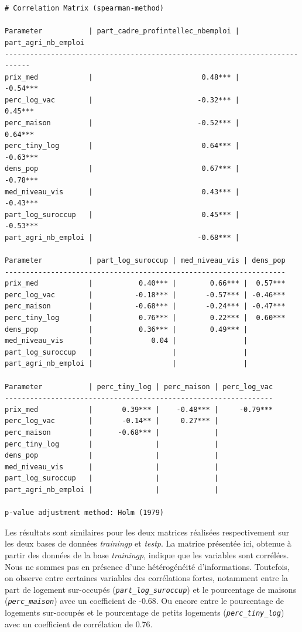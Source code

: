 \documentclass[
  french,
  11pt,
  a4paper,
]{article}
\begin{document}
\begin{verbatim}
# Correlation Matrix (spearman-method)

Parameter           | part_cadre_profintellec_nbemploi | part_agri_nb_emploi
----------------------------------------------------------------------------
prix_med            |                          0.48*** |            -0.54***
perc_log_vac        |                         -0.32*** |             0.45***
perc_maison         |                         -0.52*** |             0.64***
perc_tiny_log       |                          0.64*** |            -0.63***
dens_pop            |                          0.67*** |            -0.78***
med_niveau_vis      |                          0.43*** |            -0.43***
part_log_suroccup   |                          0.45*** |            -0.53***
part_agri_nb_emploi |                         -0.68*** |                    

Parameter           | part_log_suroccup | med_niveau_vis | dens_pop
-------------------------------------------------------------------
prix_med            |           0.40*** |        0.66*** |  0.57***
perc_log_vac        |          -0.18*** |       -0.57*** | -0.46***
perc_maison         |          -0.68*** |       -0.24*** | -0.47***
perc_tiny_log       |           0.76*** |        0.22*** |  0.60***
dens_pop            |           0.36*** |        0.49*** |         
med_niveau_vis      |              0.04 |                |         
part_log_suroccup   |                   |                |         
part_agri_nb_emploi |                   |                |         

Parameter           | perc_tiny_log | perc_maison | perc_log_vac
----------------------------------------------------------------
prix_med            |       0.39*** |    -0.48*** |     -0.79***
perc_log_vac        |       -0.14** |     0.27*** |             
perc_maison         |      -0.68*** |             |             
perc_tiny_log       |               |             |             
dens_pop            |               |             |             
med_niveau_vis      |               |             |             
part_log_suroccup   |               |             |             
part_agri_nb_emploi |               |             |             

p-value adjustment method: Holm (1979)
\end{verbatim}

Les résultats sont similaires pour les deux matrices réalisées
respectivement sur les deux bases de données \emph{trainingp} et
\emph{testp}. La matrice présentée ici, obtenue à partir des données de
la base \emph{trainingp}, indique que les variables sont corrélées. Nous
ne sommes pas en présence d'une hétérogénéité d'informations. Toutefois,
on observe entre certaines variables des corrélations fortes, notamment
entre la part de logement sur-occupés
(\emph{\texttt{part\_log\_suroccup}}) et le pourcentage de maisons
(\emph{\texttt{perc\_maison}}) avec un coefficient de -0.68. Ou encore
entre le pourcentage de logements sur-occupés et le pourcentage de
petits logements (\emph{\texttt{perc\_tiny\_log}}) avec un coefficient
de corrélation de 0.76.
\end{document}
